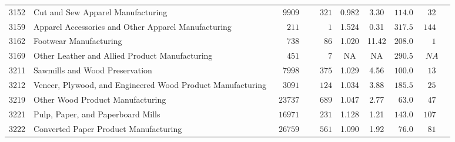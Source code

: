 \documentclass[9pt, oneside]{article}   	%
\begin{document}
\begin{longtable}{lp{3 in}ccccccc}
3152  & Cut and Sew Apparel Manufacturing & $\phantom{00}9909$ & $\phantom{000}321$ & 0.982 &  3.30 & $114.0$ & $\phantom{0}32$ \\
3159  & Apparel Accessories and Other Apparel Manufacturing & $\phantom{000}211$ & $\phantom{00000}1$ & 1.524 &  0.31 & $317.5$ & $144$ \\
3162  & Footwear Manufacturing & $\phantom{000}738$ & $\phantom{0000}86$ & 1.020 & 11.42 & $208.0$ & $\phantom{00}1$ \\
3169  & Other Leather and Allied Product Manufacturing & $\phantom{000}451$ & $\phantom{00000}7$ &    NA &    NA & $290.5$ & $\phantom{0}NA$ \\

3211  & Sawmills and Wood Preservation & $\phantom{00}7998$ & $\phantom{000}375$ & 1.029 &  4.56 & $100.0$ & $\phantom{0}13$ \\
3212  & Veneer, Plywood, and Engineered Wood Product Manufacturing & $\phantom{00}3091$ & $\phantom{000}124$ & 1.034 &  3.88 & $185.5$ & $\phantom{0}25$ \\
3219  & Other Wood Product Manufacturing & $\phantom{0}23737$ & $\phantom{000}689$ & 1.047 &  2.77 & $\phantom{0}63.0$ & $\phantom{0}47$ \\

3221  & Pulp, Paper, and Paperboard Mills & $\phantom{0}16971$ & $\phantom{000}231$ & 1.128 &  1.21 & $143.0$ & $107$ \\
3222  & Converted Paper Product Manufacturing & $\phantom{0}26759$ & $\phantom{000}561$ & 1.090 &  1.92 & $\phantom{0}76.0$ & $\phantom{0}81$ \\


\end{longtable}
\end{document}
